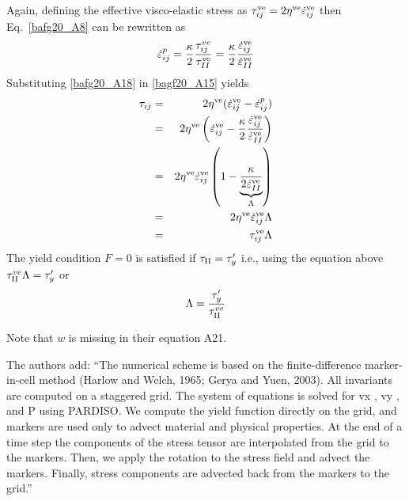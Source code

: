 Again, defining the effective visco-elastic stress as 
$\tau_{ij}^{\rm ve} 
= 2 \eta^{\rm ve}  \dot{\varepsilon}_{ij}^{\rm ve}$ then Eq.~\eqref{bafg20_A8} can be rewritten as
\begin{equation}
\dot{\varepsilon}_{ij}^p
= \frac{\kappa}{2} \frac{\tau_{ij}^{ve}}{\tau_{II}^{\rm ve}}
= \frac{\kappa}{2} \frac{\dot\varepsilon_{ij}^{\rm ve}}{\dot\varepsilon_{II}^{\rm ve}}
\label{bafg20_A18}
\end{equation}
Substituting \eqref{bafg20_A18} in \eqref{bagf20_A15} yields 
\begin{eqnarray}
\tau_{ij} 
&=& 2 \eta^{\rm ve} ( \dot{\varepsilon}_{ij}^{\rm ve} - \dot {\varepsilon}_{ij}^{p} ) \nonumber\\
&=& 2 \eta^{\rm ve} \left( \dot{\varepsilon}_{ij}^{\rm ve} - \frac{\kappa}{2} \frac{\dot\varepsilon_{ij}^{\rm ve}}{\dot\varepsilon_{II}^{\rm ve}} \right) \nonumber\\
&=& 2 \eta^{\rm ve}    \dot{\varepsilon}_{ij}^{\rm ve}
\left( 1  - \underbrace{ \frac{\kappa }{2 \dot\varepsilon_{II}^{\rm ve}}}_{\Lambda} \right) \nonumber\\
&=& 2 \eta^{\rm ve}  \dot{\varepsilon}_{ij}^{\rm ve} \Lambda \nonumber\\
&=& \tau_{ij}^{\rm ve} \Lambda \nonumber\\
\end{eqnarray}
The yield condition $F=0$ is satisfied if
$\tau_{\rm II} = \tau_y'$
i.e., using the equation above
$\tau_{\rm II}^{ve} \Lambda  = \tau_y'$
or
\[
\Lambda = \frac{\tau_y' }{\tau_{\rm II}^{ve} }
\]

Note that $w$ is missing in their equation A21.

The authors add:
``The numerical scheme is based on the finite-difference 
marker-in-cell method (Harlow and Welch, 1965;
Gerya and Yuen, 2003). All invariants are computed on a staggered grid. 
The system of equations is solved for vx , vy , and P using PARDISO. 
We compute the yield function directly on the grid, and markers are used only
to advect material and physical properties. At the end of a 
time step the components of the stress tensor
are interpolated from the grid to the markers. Then, we apply 
the rotation to the stress field and advect the
markers. Finally, stress components are advected back from the 
markers to the grid.''














